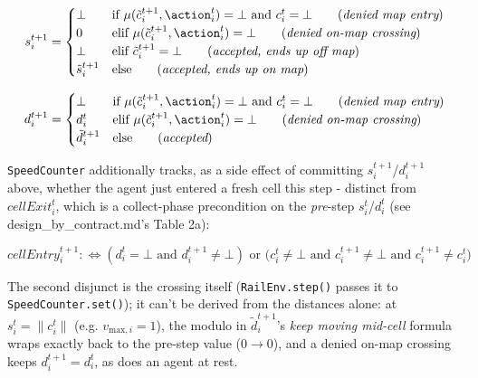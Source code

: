 \begin{equation}
s_i^{t+1} =
        \begin{cases}
            \bot & \text{if } \mu(\tilde{c}_i^{t+1}, \action_i^t) = \bot \text{ and } c_i^t = \bot \qquad (\textit{denied map entry}) \\
            0 & \text{elif } \mu(\tilde{c}_i^{t+1}, \action_i^t) = \bot \qquad (\textit{denied on-map crossing}) \\
            \bot & \text{elif } \tilde{c}_i^{t+1} = \bot \qquad (\textit{accepted, ends up off map}) \\
            \tilde{s}_i^{t+1} & \text{else} \qquad (\textit{accepted, ends up on map}) \\
        \end{cases}
\end{equation}

\begin{equation}
d_i^{t+1} =
        \begin{cases}
            \bot & \text{if } \mu(\tilde{c}_i^{t+1}, \action_i^t) = \bot \text{ and } c_i^t = \bot \qquad (\textit{denied map entry}) \\
            d_i^{t} & \text{elif } \mu(\tilde{c}_i^{t+1}, \action_i^t) = \bot \qquad (\textit{denied on-map crossing}) \\
            \tilde{d}_i^{t+1} & \text{else} \qquad (\textit{accepted}) \\
        \end{cases}
\end{equation}

\texttt{SpeedCounter} additionally tracks, as a side effect of committing $s_i^{t+1}$/$d_i^{t+1}$ above, whether the
agent just entered a fresh cell this step - distinct from $cellExit_i^t$, which is a collect-phase precondition on
the \emph{pre}-step $s_i^t$/$d_i^t$ (see design\_by\_contract.md's Table 2a):

\begin{equation}
cellEntry_i^{t+1} :\Leftrightarrow (d_i^t = \bot \text{ and } d_i^{t+1} \not= \bot) \text{ or } \big(c_i^t \not= \bot \text{ and } c_i^{t+1} \not= \bot \text{ and } c_i^{t+1} \not= c_i^t\big)
\end{equation}

The second disjunct is the crossing itself (\texttt{RailEnv.step()} passes it to \texttt{SpeedCounter.set()}); it
can't be derived from the distances alone: at $s_i^t = \lVert c_i^t \rVert$ (e.g. $v_{\text{max},i}=1$), the modulo
in $\tilde{d}_i^{t+1}$'s \textit{keep moving mid-cell} formula wraps exactly back to the pre-step value ($0 \to 0$),
and a denied on-map crossing keeps $d_i^{t+1} = d_i^t$, as does an agent at rest.
